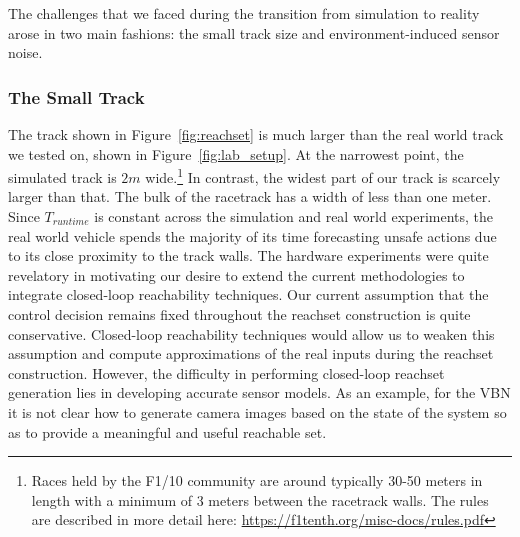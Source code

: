 \documentclass[manuscript,screen,review]{acmart}
\newcommand{\diego}[1]{\textcolor{purple}{\textbf{\underline{DM:}} #1}}
\newcommand{\figref}[1]{Figure~\ref{#1}}
\begin{document}
The challenges that we faced during the transition from simulation to reality arose in two main fashions: the small track size and environment-induced sensor noise.

\subsubsection{The Small Track} The track shown in \figref{fig:reachset} is much larger than the real world track we tested on, shown in \figref{fig:lab_setup}. At the narrowest point, the simulated track is $2m$ wide.\footnote{Races held by the F1/10 community are around typically 30-50 meters in length with a minimum of 3 meters between the racetrack walls. The rules are described in more detail here: \url{https://f1tenth.org/misc-docs/rules.pdf}} In contrast, the widest part of our track is scarcely larger than that. The bulk of the racetrack has a width of less than one meter. Since $T_{runtime}$ is constant across the simulation and real world experiments, the real world vehicle spends the majority of its time forecasting unsafe actions due to its close proximity to the track walls. The hardware experiments were quite revelatory in motivating our desire to extend the current methodologies to integrate closed-loop reachability techniques. Our current assumption that the control decision remains fixed throughout the reachset construction is quite conservative. Closed-loop reachability techniques would allow us to weaken this assumption and compute approximations of the real inputs during the reachset construction. However, the difficulty in performing closed-loop reachset generation lies in developing accurate sensor models. As an example, for the VBN it is not clear how to generate camera images based on the state of the system so as to provide a meaningful and useful reachable set.
\end{document}
